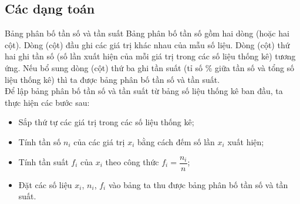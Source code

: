 \subsection{Các dạng toán}
\begin{dang}{Bảng phân bố tần số và tần suất}
Bảng phân bố tần số gồm hai dòng (hoặc hai cột). Dòng (cột) đầu ghi các giá trị khác nhau của mẫu số liệu. Dòng (cột) thứ hai ghi tần số (số lần xuất hiện của mỗi giá trị trong các số liệu thống kê) tương ứng. Nếu bổ sung dòng (cột) thứ ba ghi tần suất (tỉ số $\%$ giữa tần số và tổng số liệu thống kê) thì ta được bảng phân bố tần số và tần suất.\bigskip\\
Để lập bảng phân bố tần số và tần suất từ bảng số liệu thống kê ban đầu, ta thực hiện các bước sau:
\begin{itemize}
\item Sắp thứ tự các giá trị trong các số liệu thống kê;
\item Tính tần số $n_i$ của các giá trị $x_i$ bằng cách đếm số lần $x_i$ xuất hiện;
\item Tính tần suất $f_i$ của $x_i$ theo công thức $f_i = \dfrac{n_i}{n}$;
\item Đặt các số liệu $x_i$, $n_i$, $f_i$ vào bảng ta thu được bảng phân bố tần số và tần suất.
\end{itemize}
\end{dang}
